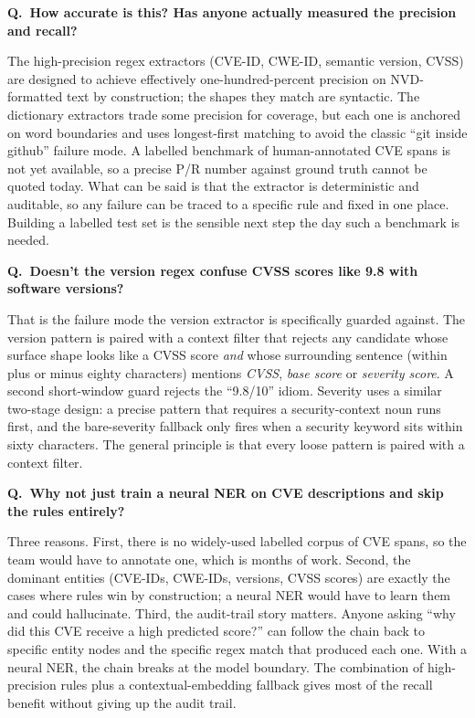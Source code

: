 \documentclass[11pt,a4paper]{article}
\newenvironment{question}[1]{%
    \par\smallskip
    \noindent\textcolor{accent}{\bfseries Q.\ #1}\par\nopagebreak
    \smallskip\noindent\ignorespaces
}{\par\medskip}
\begin{document}
\begin{question}{How accurate is this? Has anyone actually
    measured the precision and recall?}
The high-precision regex extractors (CVE-ID, CWE-ID,
semantic version, CVSS) are designed to achieve effectively
one-hundred-percent precision on NVD-formatted text by
construction; the shapes they match are syntactic. The
dictionary extractors trade some precision for coverage, but
each one is anchored on word boundaries and uses
longest-first matching to avoid the classic ``git inside
github'' failure mode. A labelled benchmark of
human-annotated CVE spans is not yet available, so a precise
P/R number against ground truth cannot be quoted today. What
can be said is that the extractor is deterministic and
auditable, so any failure can be traced to a specific rule
and fixed in one place. Building a labelled test set is
the sensible next step the day such a benchmark is needed.
\end{question}

\begin{question}{Doesn't the version regex confuse CVSS
    scores like 9.8 with software versions?}
That is the failure mode the version extractor is
specifically guarded against. The version pattern is paired
with a context filter that rejects any candidate whose
surface shape looks like a CVSS score \emph{and} whose
surrounding sentence (within plus or minus eighty
characters) mentions \emph{CVSS}, \emph{base score} or
\emph{severity score}. A second short-window guard rejects
the ``9.8/10'' idiom. Severity uses a similar two-stage
design: a precise pattern that requires a security-context
noun runs first, and the bare-severity fallback only fires
when a security keyword sits within sixty characters. The
general principle is that every loose pattern is paired
with a context filter.
\end{question}

\begin{question}{Why not just train a neural NER on CVE
    descriptions and skip the rules entirely?}
Three reasons. First, there is no widely-used labelled
corpus of CVE spans, so the team would have to annotate one,
which is months of work. Second, the dominant entities
(CVE-IDs, CWE-IDs, versions, CVSS scores) are exactly the
cases where rules win by construction; a neural NER would
have to learn them and could hallucinate. Third, the
audit-trail story matters. Anyone asking ``why did this
CVE receive a high predicted score?'' can follow the
chain back to specific entity nodes and the specific regex
match that produced each one. With a neural NER, the chain
breaks at the model boundary. The combination of
high-precision rules plus a contextual-embedding fallback
gives most of the recall benefit without giving up the
audit trail.
\end{question}
\end{document}

